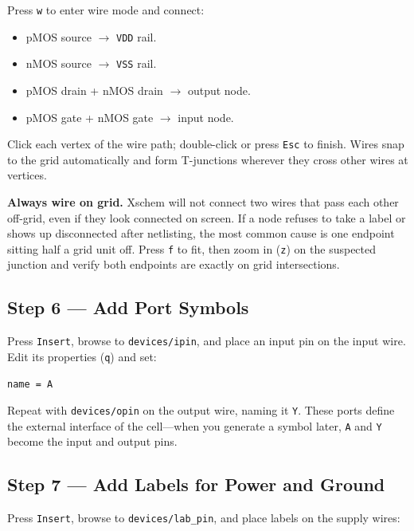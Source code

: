 \documentclass[11pt]{article}
\begin{document}
Press \texttt{w} to enter wire mode and connect:

\begin{itemize}[leftmargin=2em]
  \item pMOS source $\rightarrow$ \texttt{VDD} rail.
  \item nMOS source $\rightarrow$ \texttt{VSS} rail.
  \item pMOS drain + nMOS drain $\rightarrow$ output node.
  \item pMOS gate + nMOS gate $\rightarrow$ input node.
\end{itemize}

Click each vertex of the wire path; double-click or press \texttt{Esc}
to finish.
Wires snap to the grid automatically and form T-junctions wherever they
cross other wires at vertices.

\begin{tipbox}
\textbf{Always wire on grid.}
Xschem will not connect two wires that pass each other off-grid,
even if they look connected on screen.
If a node refuses to take a label or shows up disconnected after
netlisting, the most common cause is one endpoint sitting half a grid
unit off.
Press \texttt{f} to fit, then zoom in (\texttt{z}) on the suspected
junction and verify both endpoints are exactly on grid intersections.
\end{tipbox}

\subsection{Step 6 --- Add Port Symbols}

Press \texttt{Insert}, browse to \texttt{devices/ipin}, and place an
input pin on the input wire.
Edit its properties (\texttt{q}) and set:

\begin{lstlisting}
name = A
\end{lstlisting}

Repeat with \texttt{devices/opin} on the output wire, naming it
\texttt{Y}.
These ports define the external interface of the cell---when you
generate a symbol later, \texttt{A} and \texttt{Y} become the input
and output pins.

\subsection{Step 7 --- Add Labels for Power and Ground}

Press \texttt{Insert}, browse to \texttt{devices/lab\_pin}, and place
labels on the supply wires:
\end{document}
